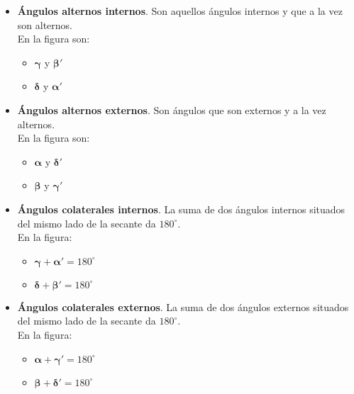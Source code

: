 \begin{itemize}
  \item \textbf{Ángulos alternos internos}. Son aquellos ángulos internos y que 
    a la vez son alternos.\\
    En la figura son: 
    \begin{itemize}
      \item $\pmb{\gamma}$ y $\pmb{\beta'}$
      \item $\pmb{\delta}$ y $\pmb{\alpha'}$
    \end{itemize}
    
  \item \textbf{Ángulos alternos externos}. Son ángulos que son externos y a la 
  vez alternos.\\
  En la figura son:
  \begin{itemize}
    \item $\pmb{\alpha}$ y $\pmb{\delta'}$
    \item $\pmb{\beta}$ y $\pmb{\gamma'}$
  \end{itemize}

  \item \textbf{Ángulos colaterales internos}. La suma de dos ángulos internos 
    situados del mismo lado de la secante da $180^\circ$.\\
    En la figura: 
    \begin{itemize}
      \item $\pmb{\gamma} + \pmb{\alpha'} = 180^\circ$
      \item $\pmb{\delta} + \pmb{\beta'} = 180^\circ$
    \end{itemize}

  \item \textbf{Ángulos colaterales externos}. La suma de dos ángulos externos 
    situados del mismo lado de la secante da $180^\circ$.\\  
    En la figura: 
    \begin{itemize}
      \item $\pmb{\alpha} + \pmb{\gamma'} = 180^\circ$
      \item $\pmb{\beta} + \pmb{\delta'} = 180^\circ$
    \end{itemize}
\end{itemize}

